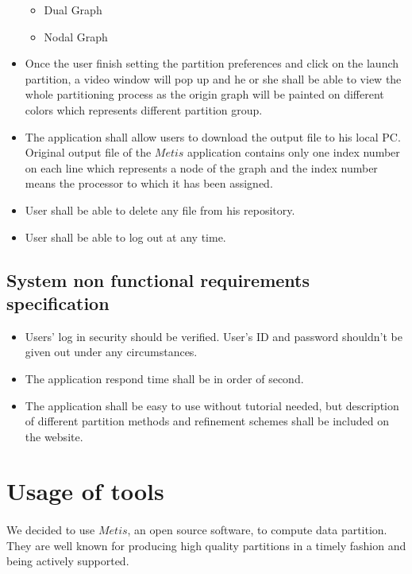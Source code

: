 \documentclass{cranfieldChart}
\begin{document}
\begin{itemize}
\begin{itemize}
        \item Dual Graph
        \item Nodal Graph 
    \end{itemize}
    \item Once the user finish setting the partition preferences and click on the launch partition, a video window will pop up and he or she shall be able to view the whole partitioning process as the origin graph will be painted on different colors which represents different partition group. 
    \item The application shall allow users to download the output file to his local PC. Original output file of the $Metis$ application contains only one index number on each line which represents a node of the graph and the index number means the processor to which it has been assigned. 
    \item User shall be able to delete any file from his repository. 
    \item User shall be able to log out at any time. 
\end{itemize}
    
\subsection{System non functional requirements specification}
\begin{itemize}
    \item Users' log in security should be verified. User's ID and password shouldn't be given out under any circumstances. 
    \item The application respond time shall be in order of second. 
    \item The application shall be easy to use without tutorial needed, but description of different partition methods and refinement schemes shall be included on the website.
 \end{itemize}
 
\section{Usage of tools}

\paragraph{}
We decided to use $Metis$, an open source software, to compute data partition. They are well known for producing high quality partitions in a timely fashion and being actively supported. 
\end{document}
